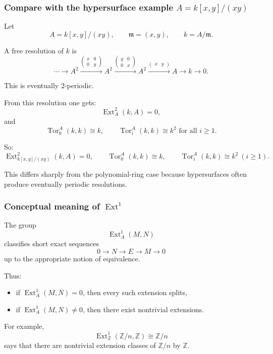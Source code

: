 \documentclass[12pt,a4paper]{article}
\theoremstyle{notespace}
\DeclareMathOperator{\Tor}{Tor}
\DeclareMathOperator{\Ext}{Ext}
\begin{document}
\subsubsection{Compare with the hypersurface example \(A=k[x,y]/(xy)\)}

Let
\[
A=k[x,y]/(xy),
\qquad
\mathfrak m=(x,y),
\qquad
k=A/\mathfrak m.
\]

A free resolution of \(k\) is
\[
\cdots
\longrightarrow A^2
\xrightarrow{\begin{pmatrix}x&0\\0&y\end{pmatrix}}
A^2
\xrightarrow{\begin{pmatrix}y&0\\0&x\end{pmatrix}}
A^2
\xrightarrow{\begin{pmatrix}x&y\end{pmatrix}}
A
\longrightarrow k
\longrightarrow 0.
\]

This is eventually \(2\)-periodic.

From this resolution one gets:
\[
\Ext_A^2(k,A)=0,
\]
and
\[
\Tor_0^A(k,k)\cong k,
\qquad
\Tor_i^A(k,k)\cong k^2 \text{ for all } i\ge 1.
\]

So:
\[
\boxed{
	\Ext_{k[x,y]/(xy)}^2(k,A)=0,
	\qquad
	\Tor_0^A(k,k)\cong k,
	\qquad
	\Tor_i^A(k,k)\cong k^2 \ (i\ge 1).
}
\]

This differs sharply from the polynomial-ring case because hypersurfaces often produce eventually periodic resolutions.

\subsubsection{Conceptual meaning of \(\Ext^1\)}

The group
\[
\Ext_A^1(M,N)
\]
classifies short exact sequences
\[
0\longrightarrow N\longrightarrow E\longrightarrow M\longrightarrow 0
\]
up to the appropriate notion of equivalence.

Thus:
\begin{itemize}
	\item if \(\Ext_A^1(M,N)=0\), then every such extension splits,
	\item if \(\Ext_A^1(M,N)\neq 0\), then there exist nontrivial extensions.
\end{itemize}

For example,
\[
\Ext_\mathbb Z^1(\mathbb Z/n,\mathbb Z)\cong \mathbb Z/n
\]
says that there are nontrivial extension classes of \(\mathbb Z/n\) by \(\mathbb Z\).
\end{document}
